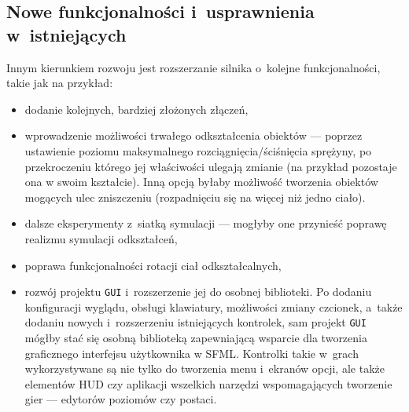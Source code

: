 \subsection*{Nowe funkcjonalności i~usprawnienia w~istniejących}
Innym kierunkiem rozwoju jest rozszerzanie silnika o~kolejne funkcjonalności, takie jak na przykład:
\begin{itemize}
	\item dodanie kolejnych, bardziej złożonych złączeń,
	\item wprowadzenie możliwości trwałego odkształcenia obiektów --- poprzez ustawienie poziomu maksymalnego rozciągnięcia/ściśnięcia sprężyny, po przekroczeniu którego jej właściwości ulegają zmianie (na przykład pozostaje ona w swoim kształcie). Inną opcją byłaby możliwość tworzenia obiektów mogących ulec zniszczeniu (rozpadnięciu się na więcej niż jedno ciało).
	\item dalsze eksperymenty z~siatką symulacji --- mogłyby one przynieść poprawę realizmu symulacji odkształceń,
	\item poprawa funkcjonalności rotacji ciał odkształcalnych,
	\item rozwój projektu \verb|GUI| i~rozszerzenie jej do osobnej biblioteki. Po dodaniu konfiguracji wyglądu, obsługi klawiatury, możliwości zmiany czcionek, a~także dodaniu nowych i~rozszerzeniu istniejących kontrolek, sam projekt \verb|GUI| mógłby stać się osobną biblioteką zapewniającą wsparcie dla tworzenia graficznego interfejsu użytkownika w SFML. Kontrolki takie w~grach wykorzystywane są nie tylko do tworzenia menu i~ekranów opcji, ale także elementów HUD czy aplikacji wszelkich narzędzi wspomagających tworzenie gier --- edytorów poziomów czy postaci.
\end{itemize}


